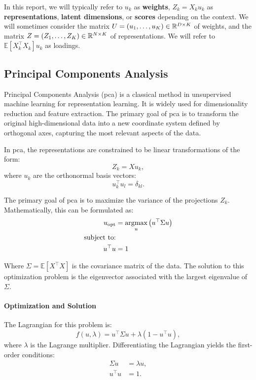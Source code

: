 In this report, we will typically refer to $u_k$ as \textbf{weights}, $Z_k = X_k u_k$ as \textbf{representations},
        \textbf{latent
dimensions}, or \textbf{scores} depending on the context. We will sometimes consider the
        matrix $U = \left(u_1, \dots, u_K\right) \in \mathbb{R}^{D \times K}$ of weights, and the
        matrix $Z = \left(Z_1, \dots, Z_K\right) \in \mathbb{R}^{N \times K}$ of representations. We will refer to $\mathbb{E
        }[X_k^\top X_k] u_k$ as loadings.

\subsection{Principal Components Analysis}

Principal Components Analysis (\acrshort{pca})\citep{hotelling1933analysis} is a classical method in unsupervised machine learning for representation learning.
It is widely used for dimensionality reduction and feature extraction.
The primary goal of \acrshort{pca} is to transform the original high-dimensional data into a new coordinate system defined by orthogonal axes, capturing the most relevant aspects of the data.

In \acrshort{pca}, the representations are constrained to be linear transformations of the form:
\begin{equation}\label{eq:pca-linear-function-def}
    Z_k = X u_k,
\end{equation}
where $u_k$ are the orthonormal basis vectors:
\begin{equation}\label{eq:pca-orthonormality-constraint}
    u_k^\top u_l = \delta_{kl}.
\end{equation}

The primary goal of \acrshort{pca} is to maximize the variance of the projections \(Z_k\). Mathematically, this can be formulated
as:
\begin{align}
    u_{\text{opt}} &= \underset{u}{\text{argmax}} \left( u^\top \Sigma u \right) \\
    \text{subject to:} \notag \\
    u^\top u &= 1 \notag
\end{align}

Where \(\Sigma = \mathbb{E}[X^\top X]\) is the covariance matrix of the data. The solution to this optimization problem is the eigenvector associated with the largest eigenvalue of \(\Sigma\).

\paragraph{Optimization and Solution}
The Lagrangian for this problem is:
\begin{equation}
    f(u,\lambda) = u^\top \Sigma u + \lambda(1 - u^\top u),
\end{equation}
where \(\lambda\) is the Lagrange multiplier. Differentiating the Lagrangian yields the first-order conditions:
\begin{align}
    \Sigma u &= \lambda u, \\
    u^\top u &= 1.
\end{align}

